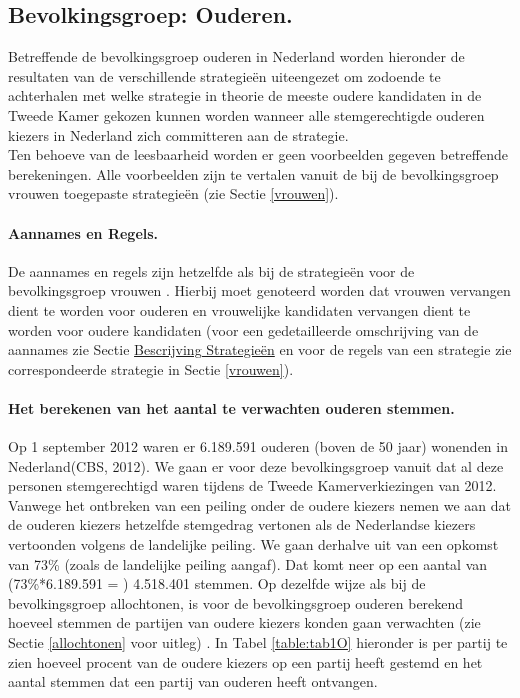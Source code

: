 \subsection{Bevolkingsgroep: Ouderen.} \label{ouderen}

Betreffende de bevolkingsgroep ouderen in Nederland worden hieronder de resultaten van de verschillende strategie\"{e}n uiteengezet om zodoende te achterhalen met welke strategie in theorie de meeste oudere kandidaten in de Tweede Kamer gekozen kunnen worden wanneer alle stemgerechtigde ouderen kiezers in Nederland zich committeren aan de strategie.\\
\indent Ten behoeve van de leesbaarheid worden er geen voorbeelden gegeven betreffende berekeningen. Alle voorbeelden zijn te vertalen vanuit de bij de bevolkingsgroep vrouwen toegepaste strategie\"{e}n (zie Sectie \ref{vrouwen}). 

\paragraph{Aannames en Regels.}
De aannames en regels zijn hetzelfde als bij de strategie\"{e}n voor de bevolkingsgroep vrouwen . Hierbij moet genoteerd worden dat vrouwen vervangen dient te worden voor ouderen en vrouwelijke kandidaten vervangen dient te worden voor oudere kandidaten (voor een gedetailleerde omschrijving van de aannames zie Sectie \hyperref[besS]{Bescrijving Strategie\"{e}n} en voor de regels van een strategie zie correspondeerde strategie in Sectie \ref{vrouwen}).

\paragraph{Het berekenen van het aantal te verwachten ouderen stemmen.}

Op 1 september 2012 waren er 6.189.591 ouderen (boven de 50 jaar) wonenden in Nederland(CBS, 2012). We gaan er voor deze bevolkingsgroep vanuit dat al deze personen stemgerechtigd waren tijdens de Tweede Kamerverkiezingen van 2012. Vanwege het ontbreken van een peiling onder de oudere kiezers nemen we aan dat de ouderen kiezers hetzelfde stemgedrag vertonen als de Nederlandse kiezers vertoonden volgens de landelijke peiling. We gaan derhalve uit van een opkomst van 73\% (zoals de landelijke peiling aangaf). Dat komt neer op een aantal van (73\%*6.189.591 = ) 4.518.401 stemmen. Op dezelfde wijze als bij de bevolkingsgroep allochtonen, is voor de bevolkingsgroep ouderen berekend hoeveel stemmen de partijen van oudere kiezers konden gaan verwachten (zie Sectie \ref{allochtonen} voor uitleg) . In Tabel \ref{table:tab1O} hieronder is per partij te zien hoeveel procent van de oudere kiezers op een partij heeft gestemd en het aantal stemmen dat een partij van ouderen heeft ontvangen.


